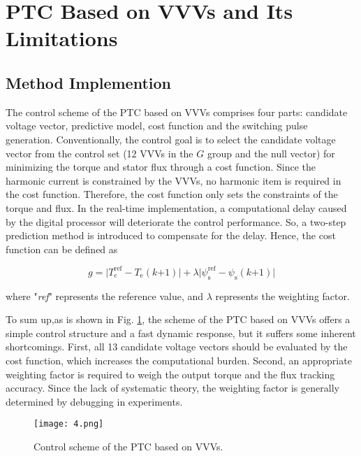 \documentclass[sn-basic]{sn-jnl}
\theoremstyle{thmstyleone}%
\theoremstyle{thmstyletwo}%
\theoremstyle{thmstylethree}%
\theoremstyle{thmstyleone}%
\begin{document}
\section{PTC Based on VVVs and Its Limitations}\label{sec3}

\subsection{Method Implemention}
The control scheme of the PTC based on VVVs comprises four parts: candidate voltage vector, predictive model, cost function and the switching pulse generation.
Conventionally, the control goal is to select the candidate voltage vector from the control set (12 VVVs in the ${G}$ group and the null vector) for minimizing the torque and stator flux through a cost function. Since the harmonic current is constrained by the VVVs, no harmonic item is required in the cost function. Therefore, the cost function only sets the constraints of the torque and flux. In the real-time implementation, a computational delay caused by the digital processor will deteriorate the control performance. So, a two-step prediction method is introduced to compensate for the delay\cite{7063269}. Hence, the cost function can be defined as

\begin{equation}
g=\lvert  T_{e}^{\text{ref}}-{{T}_{\text{e}}}( k\text{+1}) \rvert+\lambda \lvert \psi _  {\text{s}}^{\text{ref}}-{{\psi }_{\text{s}}}( k\text{+1} )\rvert
\end{equation}

where "\textit{ref}" represents the reference value, and $\lambda$ represents the weighting factor.

To sum up,as is shown in Fig. \ref{fig_4}, the scheme of the PTC based on VVVs offers a simple control structure and a fast dynamic response, but it suffers some inherent shortcomings. First, all 13 candidate voltage vectors should be evaluated by the cost function, which increases the computational burden. Second, an appropriate weighting factor is required to weigh the output torque and the flux tracking accuracy. Since the lack of systematic theory, the weighting factor is generally determined by debugging in experiments.


\begin{figure}[h]
\centering
\texttt{[image: 4.png]}
\caption{Control scheme of the PTC based on VVVs.}
\label{fig_4}
\end{figure}
\end{document}
